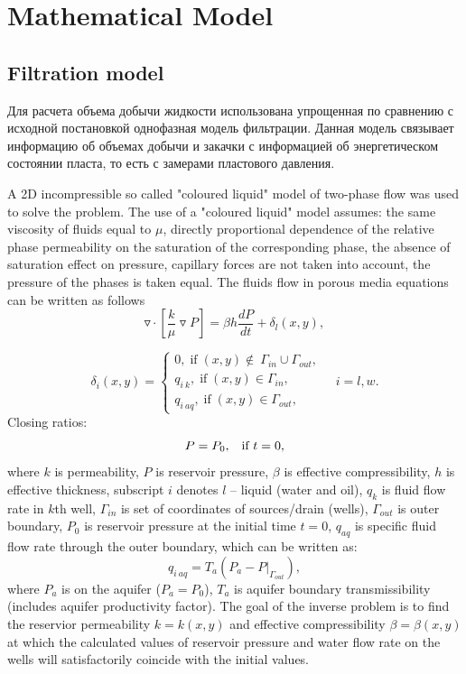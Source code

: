 \documentclass{article}
\begin{document}
\section{Mathematical Model}

\subsection{Filtration model}
Для расчета объема добычи жидкости использована упрощенная по сравнению с исходной постановкой однофазная модель фильтрации. Данная модель связывает информацию об объемах добычи и закачки с информацией об энергетическом состоянии пласта, то есть с замерами пластового давления. 

A 2D incompressible so called "coloured liquid" model of two-phase flow \cite{bas} was used to solve the problem. The use of a "coloured liquid" model assumes: the same viscosity of fluids equal to $\mu$, directly proportional dependence of the relative phase permeability on the saturation of the corresponding phase, the absence of saturation effect on pressure, capillary forces are not taken into account, the pressure of the phases is taken equal. The fluids flow in porous media
equations can be written as follows
\begin{equation} \label{fil}
	\triangledown \cdot \left[\frac{k}{\mu}\triangledown P \right] = \beta h\frac{dP}{dt} + \delta_{l}(x,y),
\end{equation}

\begin{equation} \label{bc}
	\delta_{i}(x,y)  = \left\{\begin{array}{crl}
		0, \;\mbox{if}\;(x,y) \notin\ \Gamma_{in}\cup\Gamma_{out},\\
		q_{i\:k}, \;\mbox{if}\;(x,y) \in \Gamma_{in},\\
		q_{i\:aq}, \;\mbox{if}\;(x,y) \in \Gamma_{out},
	\end{array}\right. \quad i = l,w.
\end{equation}
Closing ratios:
\begin{equation} \label{kr}
P = P_0\mbox{,\quad \mbox{if} $t=0$},
\end{equation}
where $k$ is permeability, $P$ is reservoir pressure, $\beta$ is
effective compressibility, $h$ is effective thickness, subscript $i$ denotes $l$ -- liquid
(water and oil), $q_k$ is fluid flow rate in $k$th well, $\Gamma_{in}$
is set of coordinates of sources/drain (wells), $\Gamma_{out}$ is
outer boundary, $P_0$ is reservoir pressure at the initial time $t=0$, $q_{aq}$ is specific fluid flow rate through the outer boundary, which can be written as:
\begin{equation*} \label{qaq}
	q_{i\:aq} = T_a(P_{a} - P|_{\Gamma_{out}}),
\end{equation*}
where $P_a$ is on the aquifer ($P_a = P_0$), $T_a$ is
aquifer boundary transmissibility (includes aquifer productivity factor). The goal of the inverse problem is to find the reservior permeability $k = k(x,y)$ and effective compressibility $\beta = \beta(x,y)$ at which the calculated values of reservoir pressure and water flow rate on the wells will satisfactorily coincide with the initial values.
\end{document}
